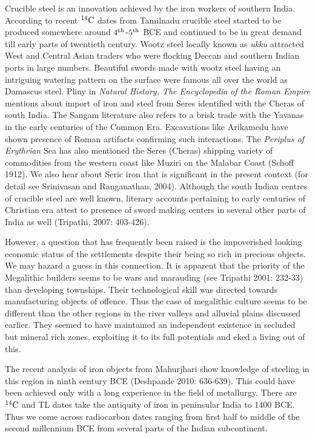 Crucible steel is an innovation achieved by the iron workers of southern India. According to recent $^{14}{\rm C}$ dates from Tamilnadu crucible steel started to be produced somewhere around $4^{\rm th}$-$5^{\rm th}$ BCE and continued to be in great demand till early parts of twentieth century. Wootz steel locally known as \textit{ukku} attracted West and Central Asian traders who were flocking Deccan and southern Indian ports in large numbers. Beautiful swords made with wootz steel having an intriguing watering pattern on the surface were famous all over the world as Damascus steel. Pliny in \textit{Natural History, The Encyclopedia of the Roman Empire} mentions about import of iron and steel from Seres identified with the Cheras of south India. The Sangam literature also refers to a brisk trade with the Yavanas in the early centuries of the Common Era. Excavations like Arikamedu have shown presence of Roman artifacts confirming such interactions. The \textit{Periplus of Erythrian} Sea has also mentioned the Seres (Cheras) shipping variety of commodities from the western coast like Muziri on the Malabar Coast (Schoff 1912). We also hear about Seric iron that is significant in the present context (for detail see Srinivasan and Ranganathan, 2004). Although the south Indian centres of crucible steel are well known, literary accounts pertaining to early centuries of Christian era attest to presence of sword making centers in several other parts of India as well (Tripathi, 2007: 403-426). 

However, a question that has frequently been raised is the impoverished looking economic status of the settlements despite their being so rich in precious objects. We may hazard a guess in this connection. It is apparent that the priority of the Megalithic builders seems to be wars and marauding (see Tripathi 2001: 232-33) than developing townships. Their technological skill was directed towards manufacturing objects of offence. Thus the case of megalithic culture seems to be different than the other regions in the river valleys and alluvial plains discussed earlier. They seemed to have maintained an independent existence in secluded but mineral rich zones, exploiting it to its full potentials and eked a living out of this.

The recent analysis of iron objects from Mahurjhari show knowledge of steeling in this region in ninth century BCE (Deshpande 2010: 636-639). This could have been achieved only with a long experience in the field of metallurgy. There are $^{14}{\rm C}$ and TL dates take the antiquity of iron in peninsular India to 1400 BCE.  Thus we come across radiocarbon dates ranging from first half to middle of the second millennium BCE from several parts of the Indian subcontinent.


